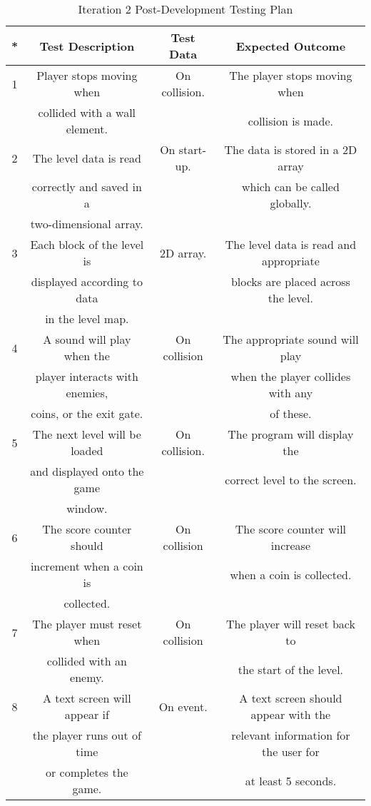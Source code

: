 \documentclass[12pt]{report}
\begin{document}
\begin{table}[H]
    \centering
    \begin{tabular}{|c|c|c|c|}
    \hline
    \textbf{*} & \textbf{Test Description} & \textbf{Test Data} & \textbf{Expected Outcome}\\
    \hline
    1 & Player stops moving when & On collision. & The player stops moving when \\
    & collided with a wall element. & & collision is made.\\
    \hline
    2 & The level data is read & On start-up. & The data is stored in a 2D array\\
      & correctly and saved in a&             & which can be called globally. \\
      & two-dimensional array. & &\\
    \hline
    3 & Each block of the level is & 2D array. & The level data is read and appropriate\\
    & displayed according to data &           & blocks are placed across the level. \\
    & in the level map. & &\\
    \hline
    4 & A sound will play when the & On collision & The appropriate sound will play\\
    & player interacts with enemies, & & when the player collides with any  \\
    & coins, or the exit gate. & & of these.\\
    \hline
    5 & The next level will be loaded & On collision. & The program will display the \\
    & and displayed onto the game & & correct level to the screen. \\
    & window. & & \\
    \hline
    6 & The score counter should & On collision & The score counter will increase\\
    & increment when a coin is & & when a coin is collected.\\
    & collected. & & \\
    \hline
    7 & The player must reset when & On collision & The player will reset back to\\
    & collided with an enemy. & & the start of the level.\\
    \hline
    8 & A text screen will appear if & On event. & A text screen should appear with the \\
      & the player runs out of time & & relevant information for the user for \\
      & or completes the game. & & at least 5 seconds.  \\
    \hline
    \end{tabular}
    \caption{Iteration 2 Post-Development Testing Plan}
    \label{TestTable}
\end{table}
\end{document}
